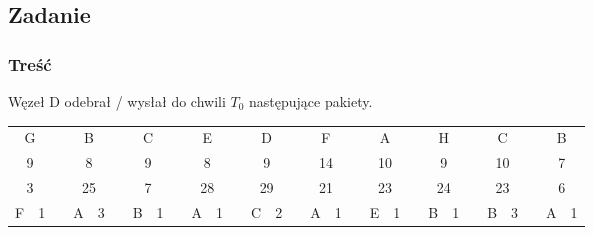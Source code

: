 	\subsection{Zadanie}
		\subsubsection{Treść}
			Węzeł D odebrał / wysłał do chwili $ T_0 $ następujące pakiety.\\
			\begin{tabular}{|c|c|c|c|c|c|c|c|c|c|c|c|c|c|c|c|c|c|c|c|c|c|c|c|c|c|c|c|c|}
				\cline{1-2} \cline{4-5} \cline{7-8} \cline{10-11} \cline{13-14} \cline{16-17} \cline{19-20} \cline{22-23} \cline{25-26} \cline{28-29}
				\multicolumn{2}{|c|}{G} &  & \multicolumn{2}{c|}{B}  &  & \multicolumn{2}{c|}{C} &  & \multicolumn{2}{c|}{E}  &  & \multicolumn{2}{c|}{D}  &  & \multicolumn{2}{c|}{F}  &  & \multicolumn{2}{c|}{A}  &  & \multicolumn{2}{c|}{H}  &  & \multicolumn{2}{c|}{C}  &  & \multicolumn{2}{c|}{B} \\ \cline{1-2} \cline{4-5} \cline{7-8} \cline{10-11} \cline{13-14} \cline{16-17} \cline{19-20} \cline{22-23} \cline{25-26} \cline{28-29} 
				\multicolumn{2}{|c|}{9} &  & \multicolumn{2}{c|}{8}  &  & \multicolumn{2}{c|}{9} &  & \multicolumn{2}{c|}{8}  &  & \multicolumn{2}{c|}{9}  &  & \multicolumn{2}{c|}{14} &  & \multicolumn{2}{c|}{10} &  & \multicolumn{2}{c|}{9}  &  & \multicolumn{2}{c|}{10} &  & \multicolumn{2}{c|}{7} \\ \cline{1-2} \cline{4-5} \cline{7-8} \cline{10-11} \cline{13-14} \cline{16-17} \cline{19-20} \cline{22-23} \cline{25-26} \cline{28-29} 
				\multicolumn{2}{|c|}{3} &  & \multicolumn{2}{c|}{25} &  & \multicolumn{2}{c|}{7} &  & \multicolumn{2}{c|}{28} &  & \multicolumn{2}{c|}{29} &  & \multicolumn{2}{c|}{21} &  & \multicolumn{2}{c|}{23} &  & \multicolumn{2}{c|}{24} &  & \multicolumn{2}{c|}{23} &  & \multicolumn{2}{c|}{6} \\ \cline{1-2} \cline{4-5} \cline{7-8} \cline{10-11} \cline{13-14} \cline{16-17} \cline{19-20} \cline{22-23} \cline{25-26} \cline{28-29} 
				F          & 1          &  & A           & 3         &  & B          & 1         &  & A           & 1         &  & C           & 2         &  & A           & 1         &  & E           & 1         &  & B           & 1         &  & B           & 3         &  & A          & 1         \\ \cline{1-2} \cline{4-5} \cline{7-8} \cline{10-11} \cline{13-14} \cline{16-17} \cline{19-20} \cline{22-23} \cline{25-26} \cline{28-29} 

\end{tabular}
